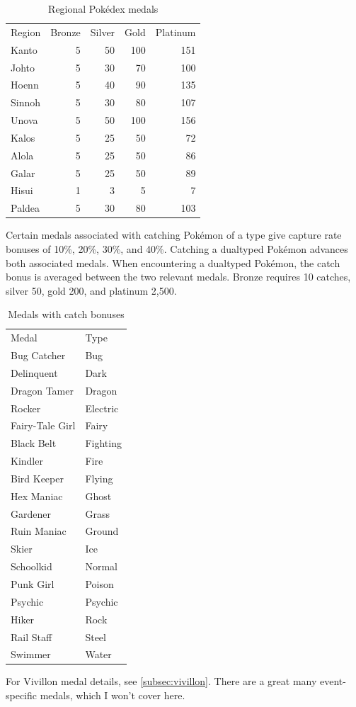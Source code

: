 \begin{table}[h]
\centering
\begin{tabular}{lrrrr}
  Region & Bronze & Silver & Gold & Platinum\\
  \Midrule
  Kanto & 5 & 50 & 100 & 151\\
  Johto & 5 & 30 & 70 & 100\\
  Hoenn & 5 & 40 & 90 & 135\\
  Sinnoh & 5 & 30 & 80 & 107\\
  Unova & 5 & 50 & 100 & 156\\
  Kalos & 5 & 25 & 50 & 72\\
  Alola & 5 & 25 & 50 & 86\\
  Galar & 5 & 25 & 50 & 89\\
  Hisui & 1 & 3 & 5 & 7\\
  Paldea & 5 & 30 & 80 & 103\\
\end{tabular}
\caption{Regional Pokédex medals}
\label{table:regionmedals}
\end{table}
Certain medals associated with catching Pokémon of a type give capture rate bonuses of 10\%, 20\%, 30\%, and 40\%.
Catching a dualtyped Pokémon advances both associated medals.
When encountering a dualtyped Pokémon, the catch bonus is averaged between the two relevant medals.
Bronze requires 10 catches, silver 50, gold 200, and platinum 2,500.
\begin{table}[hb]
\centering
\begin{tabular}{ll}
  Medal & Type\\
  \Midrule
  Bug Catcher & Bug\\
  Delinquent & Dark\\
  Dragon Tamer & Dragon\\
  Rocker & Electric\\
  Fairy-Tale Girl & Fairy\\
  Black Belt & Fighting\\
  Kindler & Fire\\
  Bird Keeper & Flying\\
  Hex Maniac & Ghost\\
  Gardener & Grass\\
  Ruin Maniac & Ground\\
  Skier & Ice\\
  Schoolkid & Normal\\
  Punk Girl & Poison\\
  Psychic & Psychic\\
  Hiker & Rock\\
  Rail Staff & Steel\\
  Swimmer & Water\\
\end{tabular}
\caption{Medals with catch bonuses}
\label{table:medalcatch}
\end{table}
For Vivillon medal details, see \autoref{subsec:vivillon}.
There are a great many event-specific medals, which I won't cover here.

